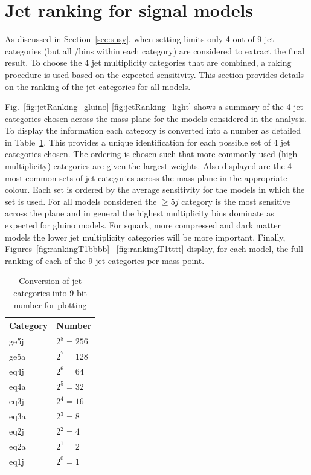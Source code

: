 \section{Jet ranking for signal models\label{app:jetRanking}}

As discussed in Section~\ref{sec:susy}, when setting limits only 4 out of 9 jet categories (but all \nb/\scalht bins
within each category) are considered to extract the final result. 
To choose the 4 jet multiplicity categories that are combined, a raking procedure 
is used based on the expected sensitivity. This section provides details on the ranking of the jet
categories for all models.

Fig.~\ref{fig:jetRanking_gluino}-\ref{fig:jetRanking_light} shows a summary of the 4 jet categories chosen across the mass plane for the models considered in the analysis.
To display the information each category is converted into a number as detailed in Table~\ref{tab:jetConversion}.
This provides a unique identification for each possible set of 4 jet categories chosen. The ordering
is chosen such that more commonly used (high multiplicity) categories are given the largest weights.
Also displayed are the 4 most common sets of jet categories across the mass plane in the appropriate colour.
Each set is ordered by the average sensitivity for the models in which the set is used. For all models 
considered the $\geq5j$ category is the most sensitive across the plane 
and in general the highest \njet multiplicity bins dominate as expected for gluino models. For squark, 
more compressed and dark matter models the lower jet multiplicity categories will be more important.
Finally, Figures~\ref{fig:rankingT1bbbb}-~\ref{fig:rankingT1tttt} display, for each model, 
the full ranking of each of the 9 jet categories per mass point.

\begin{table}[h!]
\caption{Conversion of jet categories into 9-bit number for plotting
\label{tab:jetConversion}}
\centering
\begin{tabular}{ll}
Category    & Number \\      
\hline \hline
ge5j & $2^{8} = 256$ \\
ge5a & $2^{7} = 128$ \\
eq4j & $2^{6} = 64$  \\
eq4a & $2^{5} = 32$  \\
eq3j & $2^{4} = 16$  \\
eq3a & $2^{3} = 8$   \\
eq2j & $2^{2} = 4$   \\
eq2a & $2^{1} = 2$   \\
eq1j & $2^{0} = 1$   \\
\end{tabular}
\end{table}

